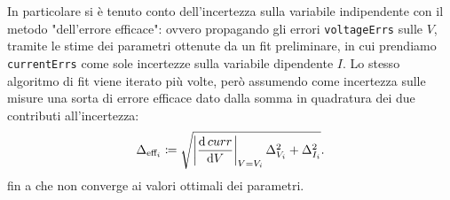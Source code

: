 \documentclass{article}[a4paper, oneside, 11pt]
\begin{document}
In particolare si è tenuto conto dell'incertezza sulla variabile indipendente
con il metodo "dell'errore efficace": ovvero propagando gli errori 
\verb'voltageErrs' sulle $V$, tramite le stime dei parametri ottenute da un fit
preliminare, in cui prendiamo \verb'currentErrs' come sole incertezze sulla
variabile dipendente $I$. Lo stesso algoritmo di fit viene iterato più volte,
però assumendo come incertezza sulle misure una sorta di errore efficace 
dato dalla somma in quadratura dei due contributi all'incertezza: 
\begin{equation}\label{eq: seff}
	\Delta_{\text{eff}_i} \coloneqq \sqrt{\left|\frac{\mathrm{d} \, curr}{\mathrm{d} V}
	\right|_{V = V_i} \Delta_{V_i}^2 + \Delta_{I_i}^2}.
\end{equation}
fin a che non converge ai valori ottimali dei parametri.
\medskip


\end{document}
